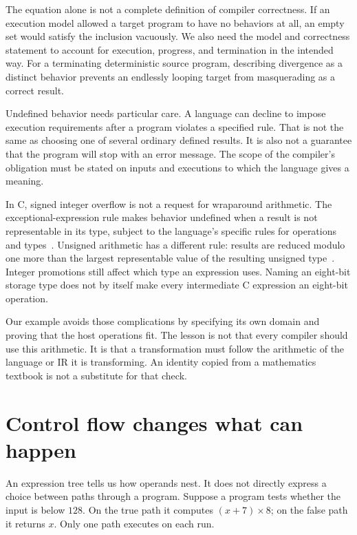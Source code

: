 The equation alone is not a complete definition of compiler correctness.
If an execution model allowed a target program to have no behaviors at all, an empty set would satisfy the inclusion vacuously.
We also need the model and correctness statement to account for execution, progress, and termination in the intended way.
For a terminating deterministic source program, describing divergence as a distinct behavior prevents an endlessly looping target from masquerading as a correct result.

Undefined behavior needs particular care.
A language can decline to impose execution requirements after a program violates a specified rule.
That is not the same as choosing one of several ordinary defined results.
It is also not a guarantee that the program will stop with an error message.
The scope of the compiler's obligation must be stated on inputs and executions to which the language gives a meaning.

In C, signed integer overflow is not a request for wraparound arithmetic.
The exceptional-expression rule makes behavior undefined when a result is not representable in its type, subject to the language's specific rules for operations and types~\cite[Section~6.5, paragraph~5]{wg14-2011-c11}.
Unsigned arithmetic has a different rule: results are reduced modulo one more than the largest representable value of the resulting unsigned type~\cite[Section~6.2.5, paragraph~9]{wg14-2011-c11}.
Integer promotions still affect which type an expression uses.
Naming an eight-bit storage type does not by itself make every intermediate C expression an eight-bit operation.

Our example avoids those complications by specifying its own domain and proving that the host operations fit.
The lesson is not that every compiler should use this arithmetic.
It is that a transformation must follow the arithmetic of the language or IR it is transforming.
An identity copied from a mathematics textbook is not a substitute for that check.

\section{Control flow changes what can happen}
\label{sec:first-control-flow-graph}

An expression tree tells us how operands nest.
It does not directly express a choice between paths through a program.
Suppose a program tests whether the input is below $128$.
On the true path it computes $(x+7)\times8$; on the false path it returns $x$.
Only one path executes on each run.

